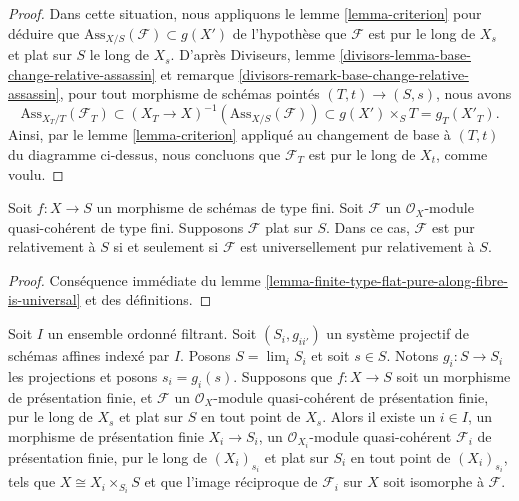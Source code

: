 \begin{proof}
\medskip\noindent
Dans cette situation, nous appliquons le
lemme \ref{lemma-criterion}
pour déduire que $\text{Ass}_{X/S}(\mathcal{F}) \subset g(X')$
de l'hypothèse que $\mathcal{F}$ est pur le long de $X_s$
et plat sur $S$ le long de $X_s$. D'après
Diviseurs, lemme \ref{divisors-lemma-base-change-relative-assassin} et
remarque \ref{divisors-remark-base-change-relative-assassin},
pour tout morphisme de schémas pointés
$(T, t) \to (S, s)$, nous avons
$$
\text{Ass}_{X_T/T}(\mathcal{F}_T) \subset
(X_T \to X)^{-1}(\text{Ass}_{X/S}(\mathcal{F})) \subset
g(X') \times_S T = g_T(X'_T).
$$
Ainsi, par le
lemme \ref{lemma-criterion}
appliqué au changement de base à $(T, t)$ du diagramme ci-dessus,
nous concluons que $\mathcal{F}_T$ est pur le long de $X_t$, comme voulu.
\end{proof}

\begin{lemma}
\label{lemma-finite-type-flat-pure-is-universal}
Soit $f : X \to S$ un morphisme de schémas de type fini.
Soit $\mathcal{F}$ un $\mathcal{O}_X$-module quasi-cohérent de type fini.
Supposons $\mathcal{F}$ plat sur $S$. Dans ce cas,
$\mathcal{F}$ est pur relativement à $S$ si et seulement si $\mathcal{F}$
est universellement pur relativement à $S$.
\end{lemma}

\begin{proof}
Conséquence immédiate du
lemme \ref{lemma-finite-type-flat-pure-along-fibre-is-universal}
et des définitions.
\end{proof}

\begin{lemma}
\label{lemma-limit-purity}
Soit $I$ un ensemble ordonné filtrant.
Soit $(S_i, g_{ii'})$ un système projectif de schémas affines indexé par $I$.
Posons $S = \lim_i S_i$ et soit $s \in S$.
Notons $g_i : S \to S_i$ les projections et posons $s_i = g_i(s)$.
Supposons que $f : X \to S$ soit un morphisme de présentation finie,
et $\mathcal{F}$ un $\mathcal{O}_X$-module quasi-cohérent de présentation finie,
pur le long de $X_s$ et plat sur $S$ en tout point de $X_s$.
Alors il existe un $i \in I$, un morphisme de présentation finie
$X_i \to S_i$, un $\mathcal{O}_{X_i}$-module quasi-cohérent $\mathcal{F}_i$
de présentation finie, pur le long de $(X_i)_{s_i}$ et plat sur $S_i$
en tout point de $(X_i)_{s_i}$, tels que $X \cong X_i \times_{S_i} S$
et que l'image réciproque de $\mathcal{F}_i$ sur $X$ soit isomorphe
à $\mathcal{F}$.
\end{lemma}

